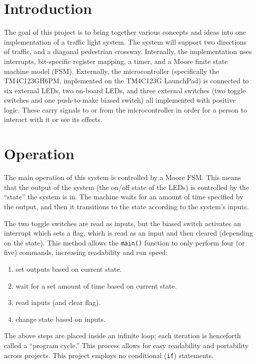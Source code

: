 \documentclass{article}
\renewcommand{\c}[1]{\texttt{#1}}
\begin{document}
\section{Introduction} The goal of this project is to bring
together various concepts and ideas into one implementation
of a traffic light system. The system will support two
directions of traffic, and a diagonal pedestrian crossway.
Internally, the implementation uses interrupts, bit-specific
register mapping,
a timer,
and a Moore finite state machine model
(FSM). Externally, the microcontroller (specifically the
TM4C123GH6PM, implemented on the TM4C123G LaunchPad) is
connected to six external LEDs, two on-board LEDs, and three
external switches (two toggle switches and one
push-to-make
biased switch) all implemented with positive logic.
These carry signals to or from the microcontroller in order
for a person to interact with it or see its effects.

\section{Operation} The main operation of this system is
controlled by a Moore FSM. This means that the output of the
system (the on/off state of the LEDs) is controlled by the
``state'' the system is in. The machine waits for an amount
of time specified by the output, and then it transitions to
the state according to the system's inputs.

The two toggle
switches are read as inputs, but the biased switch activates
an interrupt which sets a flag, which is read as an input and
then cleared (depending on the state). This method allows
the \c{main()} function to only perform four (or five) commands,
increasing readability and run speed:
\begin{enumerate}
    \item set outputs based on current state.
    \item wait for a set amount of time based on current state.
    \item read inputs (and clear flag).
    \item change state based on inputs.
\end{enumerate}
The above steps are placed inside an infinite loop;
each iteration is henceforth called a ``program cycle.''
This process allows for easy readability and portability
across projects. This project employs no conditional (\c{if})
statements.
\end{document}
